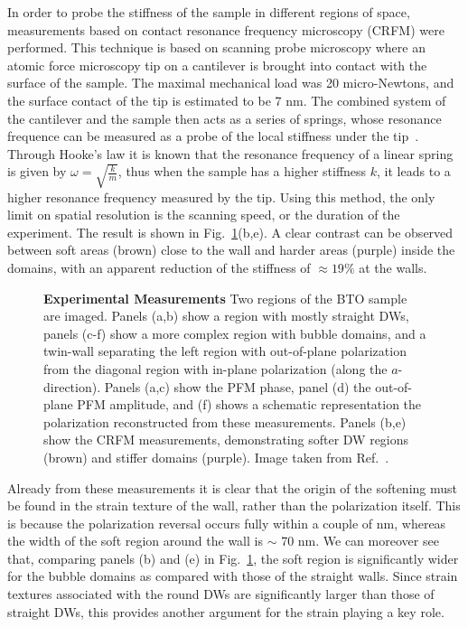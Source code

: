 In order to probe the stiffness of the sample in different regions of space, measurements based on contact resonance frequency microscopy (CRFM) were performed.
This technique is based on scanning probe microscopy where an atomic force microscopy tip on a cantilever is brought into contact with the surface of the sample.
The maximal mechanical load was 20 micro-Newtons, and the surface contact of the tip is estimated to be 7 nm. 
The combined system of the cantilever and the sample then acts as a series of springs, whose resonance frequence can be measured as a probe of the local stiffness under the tip~\cite{Rabe2000}.
Through Hooke's law it is known that the resonance frequency of a linear spring is given by $\omega = \sqrt{\frac{k}{m}}$, thus when the sample has a higher stiffness $k$, it leads to a higher resonance frequency measured by the tip.
Using this method, the only limit on spatial resolution is the scanning speed, or the duration of the experiment.
The result is shown in Fig.~\ref{fig:BTO_experiment}(b,e).
A clear contrast can be observed between soft areas (brown) close to the wall and harder areas (purple) inside the domains, with an apparent reduction of the stiffness of $\approx 19\%$ at the walls.

\begin{figure}
	\caption{\label{fig:BTO_experiment} {\bf Experimental Measurements} Two regions of the BTO sample are imaged. Panels (a,b) show a region with mostly straight DWs, panels (c-f) show a more complex region with bubble domains, and a twin-wall separating the left region with out-of-plane polarization from the diagonal region with in-plane polarization (along the $a$-direction). Panels (a,c) show the PFM phase, panel (d) the out-of-plane PFM amplitude, and (f) shows a schematic representation the polarization reconstructed from these measurements. Panels (b,e) show the CRFM measurements, demonstrating softer DW regions (brown) and stiffer domains (purple). Image taken from Ref.~\cite{Stefani2020}.}
\end{figure}

Already from these measurements it is clear that the origin of the softening must be found in the strain texture of the wall, rather than the polarization itself.
This is because the polarization reversal occurs fully within a couple of nm, whereas the width of the soft region around the wall is $\sim$ 70 nm.
We can moreover see that, comparing panels (b) and (e) in Fig.~\ref{fig:BTO_experiment}, the soft region is significantly wider for the bubble domains as compared with those of the straight walls.
Since strain textures associated with the round DWs are significantly larger than those of straight DWs, this provides another argument for the strain playing a key role. 

